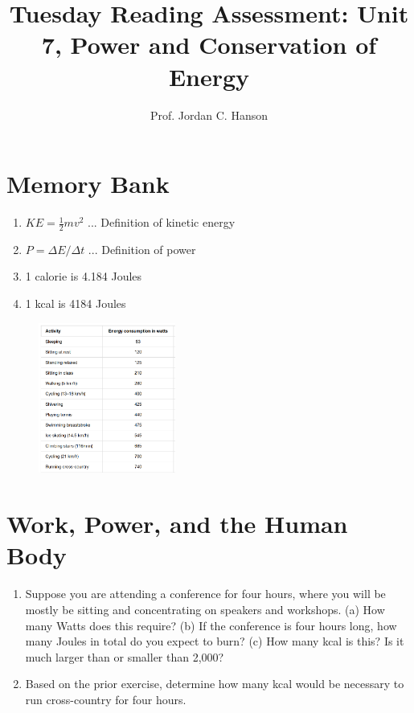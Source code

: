 \documentclass{article}
\begin{document}
\title{Tuesday Reading Assessment: Unit 7, Power and Conservation of Energy}
\author{Prof. Jordan C. Hanson}

\maketitle

\section{Memory Bank}

\begin{enumerate}
\item $KE = \frac{1}{2}m v^2$ ... Definition of kinetic energy
\item $P = \Delta E / \Delta t$ ... Definition of power
\item 1 calorie is 4.184 Joules
\item 1 kcal is 4184 Joules
\end{enumerate}

\begin{figure}[ht]
\centering
\includegraphics[width=0.4\textwidth]{powertable.png}
\caption{\label{fig:powertable}}
\end{figure}

\section{Work, Power, and the Human Body}

\begin{enumerate}
\item Suppose you are attending a conference for four hours, where you will be mostly be sitting and concentrating on speakers and workshops. (a) How many Watts does this require?  (b) If the conference is four hours long, how many Joules in total do you expect to burn? (c) How many kcal is this?  Is it much larger than or smaller than 2,000? \\ \vspace{1cm}
\item Based on the prior exercise, determine how many kcal would be necessary to run cross-country for four hours.
\end{enumerate}
\end{document}
